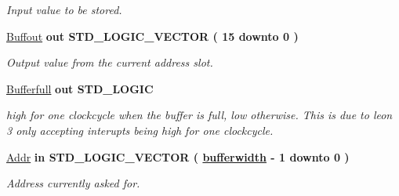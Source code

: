 \begin{DoxyCompactItemize}
\begin{DoxyCompactList}\small\item\em Input value to be stored. \end{DoxyCompactList}\item 
\hypertarget{classADC__buffer_ae32ca2a63fbe2fd9bbe609ba799ce989}{\hyperlink{classADC__buffer_ae32ca2a63fbe2fd9bbe609ba799ce989}{Buffout}  {\bfseries {\bfseries \textcolor{vhdlkeyword}{out}\textcolor{vhdlchar}{ }}} {\bfseries \textcolor{comment}{S\-T\-D\-\_\-\-L\-O\-G\-I\-C\-\_\-\-V\-E\-C\-T\-O\-R}\textcolor{vhdlchar}{ }\textcolor{vhdlchar}{(}\textcolor{vhdlchar}{ }\textcolor{vhdlchar}{ } \textcolor{vhdldigit}{15} \textcolor{vhdlchar}{ }\textcolor{vhdlchar}{ }\textcolor{vhdlchar}{ }\textcolor{vhdlkeyword}{downto}\textcolor{vhdlchar}{ }\textcolor{vhdlchar}{ }\textcolor{vhdlchar}{ } \textcolor{vhdldigit}{0} \textcolor{vhdlchar}{ }\textcolor{vhdlchar}{)}\textcolor{vhdlchar}{ }} }\label{classADC__buffer_ae32ca2a63fbe2fd9bbe609ba799ce989}

\begin{DoxyCompactList}\small\item\em Output value from the current address slot. \end{DoxyCompactList}\item 
\hypertarget{classADC__buffer_a4f849708d4274223b88930c2568f405c}{\hyperlink{classADC__buffer_a4f849708d4274223b88930c2568f405c}{Bufferfull}  {\bfseries {\bfseries \textcolor{vhdlkeyword}{out}\textcolor{vhdlchar}{ }}} {\bfseries \textcolor{comment}{S\-T\-D\-\_\-\-L\-O\-G\-I\-C}\textcolor{vhdlchar}{ }} }\label{classADC__buffer_a4f849708d4274223b88930c2568f405c}

\begin{DoxyCompactList}\small\item\em high for one clockcycle when the buffer is full, low otherwise. This is due to leon 3 only accepting interupts being high for one clockcycle. \end{DoxyCompactList}\item 
\hypertarget{classADC__buffer_ab93f1c6757ecccdcea2252108bb7caff}{\hyperlink{classADC__buffer_ab93f1c6757ecccdcea2252108bb7caff}{Addr}  {\bfseries {\bfseries \textcolor{vhdlkeyword}{in}\textcolor{vhdlchar}{ }}} {\bfseries \textcolor{comment}{S\-T\-D\-\_\-\-L\-O\-G\-I\-C\-\_\-\-V\-E\-C\-T\-O\-R}\textcolor{vhdlchar}{ }\textcolor{vhdlchar}{(}\textcolor{vhdlchar}{ }\textcolor{vhdlchar}{ }{\bfseries \hyperlink{classADC__buffer_a2f94b7b31a8914ee23be5e000f89e921}{bufferwidth}} \textcolor{vhdlchar}{ }\textcolor{vhdlchar}{-\/}\textcolor{vhdlchar}{ } \textcolor{vhdldigit}{1} \textcolor{vhdlchar}{ }\textcolor{vhdlchar}{ }\textcolor{vhdlchar}{ }\textcolor{vhdlkeyword}{downto}\textcolor{vhdlchar}{ }\textcolor{vhdlchar}{ }\textcolor{vhdlchar}{ } \textcolor{vhdldigit}{0} \textcolor{vhdlchar}{ }\textcolor{vhdlchar}{)}\textcolor{vhdlchar}{ }} }\label{classADC__buffer_ab93f1c6757ecccdcea2252108bb7caff}

\begin{DoxyCompactList}\small\item\em Address currently asked for. \end{DoxyCompactList}\end{DoxyCompactItemize}


